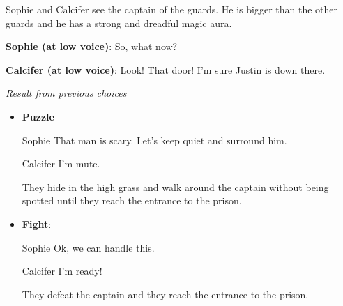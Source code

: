 
\begin{screenplay}

Sophie and Calcifer see the captain of the guards. He is bigger than the other guards and he has a strong and dreadful magic aura.

\textbf{Sophie (at low voice)}: So, what now?

\textbf{Calcifer (at low voice)}: Look! That door! I'm sure Justin is down there.

\end{screenplay}

\textit{Result from previous choices}
\begin{itemize}
  \item \textbf{Puzzle}
  
\begin{screenplay}

\begin{dialogue}{Sophie}
  That man is scary. Let's keep quiet and surround him.
\end{dialogue}

\begin{dialogue}{Calcifer}
  I'm mute.
\end{dialogue}
  
\end{screenplay}
\vspace{1em}
  
  They hide in the high grass and walk around the captain without being spotted until they reach the entrance to the prison.

  \item \textbf{Fight}:
  
\begin{screenplay}

\begin{dialogue}{Sophie}
  Ok, we can handle this.
\end{dialogue}
  
\begin{dialogue}{Calcifer}
  I'm ready!
\end{dialogue}

\end{screenplay}
\vspace{1em}
  
  They defeat the captain and they reach the entrance to the prison.
\end{itemize}

